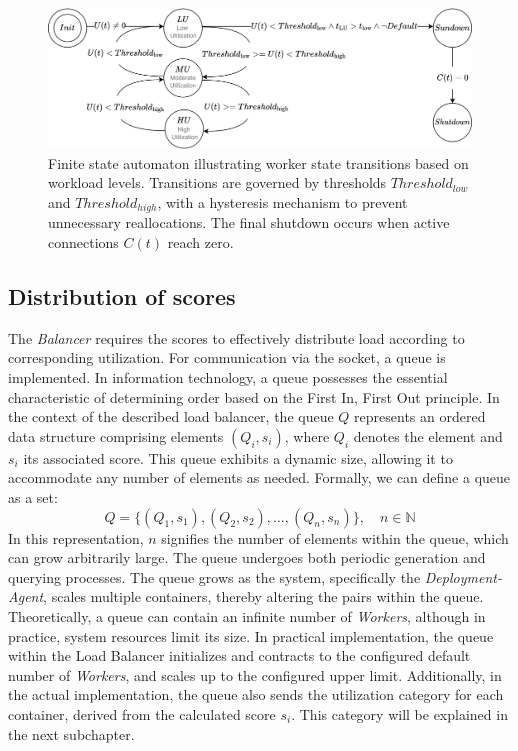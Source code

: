 \documentclass[twocolumn]{webofc}
\begin{document}
    \begin{figure}[htbp]
        \centering
        \includegraphics[width=\textwidth]{utilizations.drawio.png}
        \caption{Finite state automaton illustrating worker state transitions based on workload levels. Transitions are governed by thresholds $Threshold_{low}$ and $Threshold_{high}$, with a hysteresis mechanism to prevent unnecessary reallocations. The final shutdown occurs when active connections $C(t)$ reach zero.}
        \label{fig:automat}
    \end{figure}

    \subsection{Distribution of scores}
    The \textit{Balancer} requires the scores to effectively distribute load according to corresponding utilization. For communication via the socket, a queue is implemented. In information technology, a queue possesses the essential characteristic of determining order based on the First In, First Out principle\cite{arpaci-dusseau2014operating}. In the context of the described load balancer, the queue \( Q \) represents an ordered data structure comprising elements \( (Q_i, s_i) \), where \( Q_i \) denotes the element and \( s_i \) its associated score. This queue exhibits a dynamic size, allowing it to accommodate any number of elements as needed. Formally, we can define a queue as a set:
    $$Q = \{ (Q_1, s_1), (Q_2, s_2), \dots, (Q_n, s_n) \}, \quad n \in \mathbb{N}$$
    In this representation, \( n \) signifies the number of elements within the queue, which can grow arbitrarily large. The queue undergoes both periodic generation and querying processes. The queue grows as the system, specifically the \textit{Deployment-Agent}, scales multiple containers, thereby altering the pairs within the queue. Theoretically, a queue can contain an infinite number of \textit{Workers}, although in practice, system resources limit its size. In practical implementation, the queue within the Load Balancer initializes and contracts to the configured default number of \textit{Workers}, and scales up to the configured upper limit. Additionally, in the actual implementation, the queue also sends the utilization category for each container, derived from the calculated score \( s_i \). This category will be explained in the next subchapter.
\end{document}
